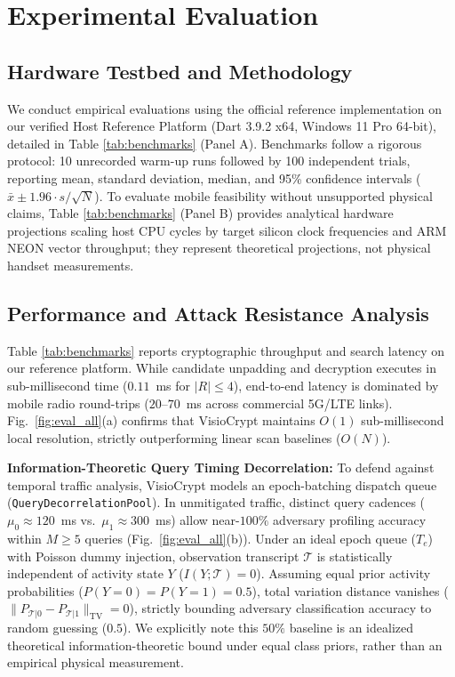 \documentclass[10pt,conference]{IEEEtran}
\begin{document}
\section{Experimental Evaluation}
\enlargethispage{2\baselineskip}
\subsection{Hardware Testbed and Methodology}
We conduct empirical evaluations using the official reference implementation on our verified Host Reference Platform (Dart 3.9.2 x64, Windows 11 Pro 64-bit), detailed in Table \ref{tab:benchmarks} (Panel A). Benchmarks follow a rigorous protocol: 10 unrecorded warm-up runs followed by 100 independent trials, reporting mean, standard deviation, median, and 95\% confidence intervals ($\bar{x} \pm 1.96 \cdot s/\sqrt{N}$). To evaluate mobile feasibility without unsupported physical claims, Table \ref{tab:benchmarks} (Panel B) provides analytical hardware projections scaling host CPU cycles by target silicon clock frequencies and ARM NEON vector throughput; they represent theoretical projections, not physical handset measurements.

\subsection{Performance and Attack Resistance Analysis}
Table \ref{tab:benchmarks} reports cryptographic throughput and search latency on our reference platform. While candidate unpadding and decryption executes in sub-millisecond time ($0.11$~ms for $|R| \le 4$), end-to-end latency is dominated by mobile radio round-trips ($20$--$70$~ms across commercial 5G/LTE links). Fig.~\ref{fig:eval_all}(a) confirms that VisioCrypt maintains $O(1)$ sub-millisecond local resolution, strictly outperforming linear scan baselines ($O(N)$).

\textbf{Information-Theoretic Query Timing Decorrelation:} To defend against temporal traffic analysis, VisioCrypt models an epoch-batching dispatch queue (\texttt{QueryDecorrelationPool}). In unmitigated traffic, distinct query cadences ($\mu_0 \approx 120$~ms vs.\ $\mu_1 \approx 300$~ms) allow near-$100\%$ adversary profiling accuracy within $M \ge 5$ queries (Fig.~\ref{fig:eval_all}(b)). Under an ideal epoch queue ($T_e$) with Poisson dummy injection, observation transcript $\mathcal{T}$ is statistically independent of activity state $Y$ ($I(Y; \mathcal{T}) = 0$). Assuming equal prior activity probabilities ($P(Y=0) = P(Y=1) = 0.5$), total variation distance vanishes ($\|P_{\mathcal{T}|0} - P_{\mathcal{T}|1}\|_{\text{TV}} = 0$), strictly bounding adversary classification accuracy to random guessing ($0.5$). We explicitly note this $50\%$ baseline is an idealized theoretical information-theoretic bound under equal class priors, rather than an empirical physical measurement.
\end{document}
